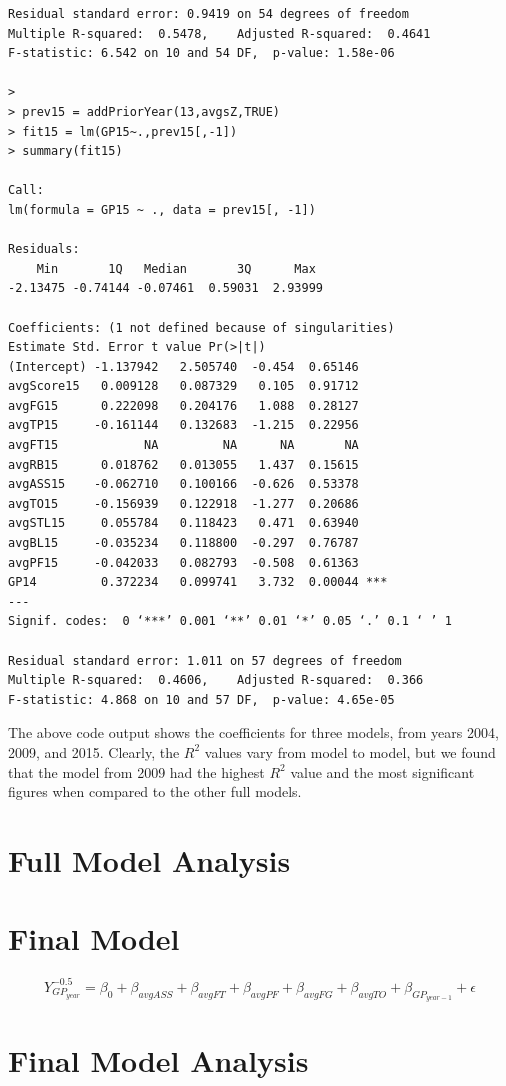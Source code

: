 \documentclass[]{scrartcl}
\begin{document}
\begin{verbatim}
Residual standard error: 0.9419 on 54 degrees of freedom
Multiple R-squared:  0.5478,	Adjusted R-squared:  0.4641 
F-statistic: 6.542 on 10 and 54 DF,  p-value: 1.58e-06

>
> prev15 = addPriorYear(13,avgsZ,TRUE)
> fit15 = lm(GP15~.,prev15[,-1])
> summary(fit15)

Call:
lm(formula = GP15 ~ ., data = prev15[, -1])

Residuals:
    Min       1Q   Median       3Q      Max 
-2.13475 -0.74144 -0.07461  0.59031  2.93999 

Coefficients: (1 not defined because of singularities)
Estimate Std. Error t value Pr(>|t|)    
(Intercept) -1.137942   2.505740  -0.454  0.65146    
avgScore15   0.009128   0.087329   0.105  0.91712    
avgFG15      0.222098   0.204176   1.088  0.28127    
avgTP15     -0.161144   0.132683  -1.215  0.22956    
avgFT15            NA         NA      NA       NA    
avgRB15      0.018762   0.013055   1.437  0.15615    
avgASS15    -0.062710   0.100166  -0.626  0.53378    
avgTO15     -0.156939   0.122918  -1.277  0.20686    
avgSTL15     0.055784   0.118423   0.471  0.63940    
avgBL15     -0.035234   0.118800  -0.297  0.76787    
avgPF15     -0.042033   0.082793  -0.508  0.61363    
GP14         0.372234   0.099741   3.732  0.00044 ***
---
Signif. codes:  0 ‘***’ 0.001 ‘**’ 0.01 ‘*’ 0.05 ‘.’ 0.1 ‘ ’ 1

Residual standard error: 1.011 on 57 degrees of freedom
Multiple R-squared:  0.4606,	Adjusted R-squared:  0.366 
F-statistic: 4.868 on 10 and 57 DF,  p-value: 4.65e-05
\end{verbatim}
The above code output shows the coefficients for three models, from years 2004, 2009, and 2015. Clearly, the $R^{2}$ values vary from model to model, but we found that the model from 2009 had the highest $R^{2}$ value and the most significant figures when compared to the other full models.
\section*{Full Model Analysis}
\section*{Final Model}
	\[
Y_{GP_{year}}^{-0.5} = \beta_0 + \beta_{avgASS} +\beta_{avgFT} + \beta_{avgPF} + \beta_{avgFG} + \beta_{avgTO} + \beta_{GP_{year-1}}+ \epsilon 
\]
\section*{Final Model Analysis}
\end{document}

